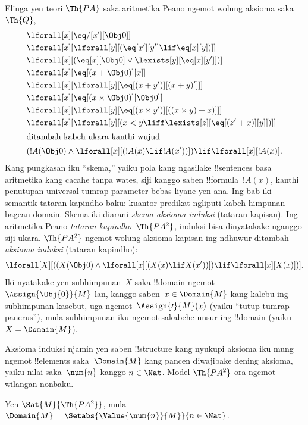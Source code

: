 \documentclass[../../../include/open-logic-section]{subfiles}
\begin{document}


Elinga yen teori $\Th{PA}$ saka aritmetika Peano ngemot
wolung aksioma saka~$\Th{Q}$,
\begin{align*}
& \lforall[x][\eq/[x'][\Obj 0]]\\
& \lforall[x][\lforall[y][(\eq[x'][y'] \lif \eq[x][y])]]\\
& \lforall[x][(\eq[x][\Obj 0] \lor \lexists[y][\eq[x][y']])]\\ 
& \lforall[x][\eq[(x + \Obj 0)][x]]\\
& \lforall[x][\lforall[y][\eq[(x + y')][(x + y)']]]\\
& \lforall[x][\eq[(x \times \Obj 0)][\Obj 0]]\\
& \lforall[x][\lforall[y][\eq[(x \times y')][((x \times y) + x)]]]\\
& \lforall[x][\lforall[y][(x < y \liff \lexists[z][\eq[(z' + x)][y]])]]\\
\intertext{ditambah kabeh ukara kanthi wujud}
& (!A(\Obj 0) \land \lforall[x][(!A(x) \lif !A(x'))]) \lif \lforall[x][!A(x)].
\end{align*}
Kang pungkasan iku ``skema,'' yaiku pola kang ngasilake
!!{sentence}s basa aritmetika kang cacahe tanpa wates,
siji kanggo saben !!{formula}~$!A(x)$, kanthi penutupan universal tumrap parameter bebas liyane yen ana. Ing bab iki semantik tataran kapindho baku: kuantor predikat ngliputi kabeh himpunan bagean domain. Skema iki diarani
\emph{skema aksioma induksi} (tataran kapisan).
Ing aritmetika Peano \emph{tataran kapindho}~$\Th{PA^2}$,
induksi bisa dinyatakake nganggo siji ukara.
$\Th{PA^2}$ ngemot wolung aksioma kapisan ing ndhuwur
ditambah \emph{aksioma induksi} (tataran kapindho):
\[
\lforall[X][((X(\Obj 0) \land \lforall[x][(X(x) \lif X(x'))]) \lif \lforall[x][X(x)])].
\]
Iki nyatakake yen subhimpunan~$X$ saka !!{domain}
ngemot~$\Assign{\Obj{0}}{M}$ lan, kanggo saben~$x \in \Domain{M}$
kang kalebu ing subhimpunan kasebut, uga
ngemot~$\Assign{\prime}{M}(x)$ (yaiku ``tutup tumrap
panerus''), mula subhimpunan iku ngemot sakabehe unsur
ing !!{domain} (yaiku $X = \Domain{M}$).

Aksioma induksi njamin yen saben !!{structure} kang nyukupi
aksioma iku mung ngemot !!{element}s saka~$\Domain{M}$
kang pancen diwajibake dening aksioma, yaiku nilai
saka~$\num{n}$ kanggo $n \in \Nat$. Model
$\Th{PA^2}$ ora ngemot wilangan nonbaku.

\begin{thm}
Yen $\Sat{M}{\Th{PA^2}}$, mula $\Domain{M} =
\Setabs{\Value{\num{n}}{M}}{n \in \Nat}$.
\end{thm}
\end{document}

